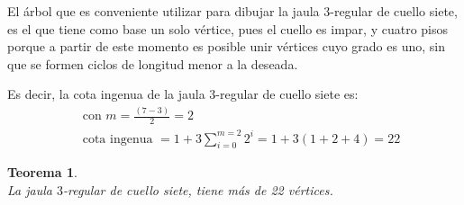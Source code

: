 \documentclass[12pt]{book}
\newtheorem{theorem}{Teorema}
\theoremstyle{definition}
\begin{document}


El árbol que es conveniente utilizar para dibujar la jaula $3$-regular
de cuello siete, es el que tiene como base un solo vértice, pues el
cuello es impar, y cuatro pisos porque a partir de este momento es
posible unir vértices cuyo grado es uno, sin que se formen ciclos de
longitud menor a la deseada.

Es decir, la cota ingenua de la jaula 3-regular de cuello siete es:
\begin{equation*}
\begin{split}
  &\text{ con } m=\frac{(7-3)}{2}=2\\
 &\text{ cota ingenua }=1+3\sum^{m=2}_{i=0} 2^i=1+3(1+2+4)=22
\end{split}
\end{equation*}


\begin{theorem}\textbf{}\\
\label{Noexiste(3,7)de22}
La jaula $3$-regular de cuello siete, tiene más de 22 vértices.
\end{theorem}
\end{document}
